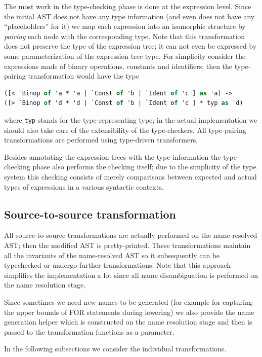 The most work in the type-checking phase is done at the expression level. Since the 
initial AST does not have any type information (and even does not have any ``placeholders'' 
for it) we map each expression into an isomorphic structure by \emph{pairing} each node 
with the corresponding type. Note that this transformation does not preserve the type of
the expression tree; it can not even be expressed by some parameterization of the
expression tree type. For simplicity consider the expressions made of binary operations,
constants and identifiers; then the type-pairing transformation would have the type

\begin{lstlisting}[language=ocaml]
([< `Binop of 'a * 'a | `Const of 'b | `Ident of 'c ] as 'a) ->
([> `Binop of 'd * 'd | `Const of 'b | `Ident of 'c ] * typ as 'd)
\end{lstlisting}

where \lstinline{typ} stands for the type-representing type; in the actual implementation
we should also take care of the extensibility of the type-checkers. All type-pairing
transformations are performed using type-driven transformers.

Besides annotating the expression trees with the type information the type-checking 
phase also performs the checking itself; due to the simplicity of the type system
this checking consists of merely comparisons between expected and actual types of expressions
in a various syntactic contexts.

\subsection{Source-to-source transformation}

All source-to-source transformations are actually performed on the name-resolved AST; then
the modified AST is pretty-printed. These transformations maintain all the invariants of
the name-resolved AST so it subsequently can be typechecked or undergo further 
transformations. Note that this approach simplifies the implementation a lot since all name 
disambiguation is performed on the name resolution stage.

Since sometimes we need new names to be generated (for example for capturing the upper bounds of
FOR statements during lowering) we also provide the name generation helper which is constructed
on the name resolution stage and then is passed to the transformation functions as a parameter.

In the following subsections we consider the individual transformations.

